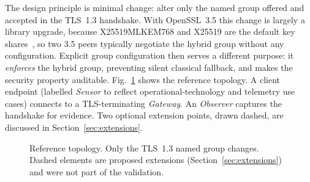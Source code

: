 \documentclass[conference]{IEEEtran}
\begin{document}
The design principle is minimal change: alter only the named group offered and accepted in the TLS~1.3 handshake. With OpenSSL~3.5 this change is largely a library upgrade, because X25519MLKEM768 and X25519 are the default key shares~\cite{openssl35}, so two 3.5 peers typically negotiate the hybrid group without any configuration. Explicit group configuration then serves a different purpose: it \emph{enforces} the hybrid group, preventing silent classical fallback, and makes the security property auditable. Fig.~\ref{fig:arch} shows the reference topology. A client endpoint (labelled \emph{Sensor} to reflect operational-technology and telemetry use cases) connects to a TLS-terminating \emph{Gateway}. An \emph{Observer} captures the handshake for evidence. Two optional extension points, drawn dashed, are discussed in Section~\ref{sec:extensions}.

\begin{figure}[t]
\centering
{}
\caption{Reference topology. Only the TLS~1.3 named group changes. Dashed elements are proposed extensions (Section~\ref{sec:extensions}) and were not part of the validation.}
\label{fig:arch}
\end{figure}
\end{document}

